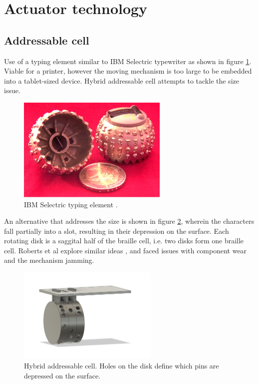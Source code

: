 \section{Actuator technology}
    \subsection{Addressable cell}
    Use of a typing element similar to IBM Selectric typewriter as shown in figure \ref{fig:IBM_Selectric_Globe_Wiki.jpg}. Viable for a printer, however the moving mechanism is too large to be embedded into a tablet-sized device. Hybrid addressable cell attempts to tackle the size issue.
    \begin{figure}[h]
    \centering
        \includegraphics[height=5cm]{figures/IBM_Selectric_Globe_Wiki.jpg}
    \caption[IBM Selectric typing element]{IBM Selectric typing element \cite{wiki:IBMSelectric}.}
    \label{fig:IBM_Selectric_Globe_Wiki.jpg}
    \end{figure}

    An alternative that addresses the size is shown in figure \ref{fig:rotation.png}, wherein the characters fall partially into a slot, resulting in their depression on the surface. Each rotating disk is a saggital half of the braille cell, i.e. two disks form one braille cell. Roberts et al explore similar ideas \cite{roberts_492_2000}, and faced issues with component wear and the mechanism jamming.

    \begin{figure}[h]
    \centering
        \includegraphics[width=0.6\textwidth]{figures/rotation.png}
    \caption{Hybrid addressable cell. Holes on the disk define which pins are depressed on the surface.}
    \label{fig:rotation.png}
    \end{figure}

